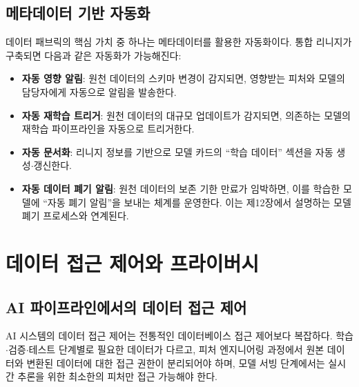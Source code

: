 \subsection{메타데이터 기반 자동화}
\label{sec:9.2.3}

데이터 패브릭의 핵심 가치 중 하나는 메타데이터를 활용한 자동화이다. 통합 리니지가 구축되면 다음과 같은 자동화가 가능해진다:

\begin{itemize}
 \item \textbf{자동 영향 알림}: 원천 데이터의 스키마 변경이 감지되면, 영향받는 피처와 모델의 담당자에게 자동으로 알림을 발송한다.
 \item \textbf{자동 재학습 트리거}: 원천 데이터의 대규모 업데이트가 감지되면, 의존하는 모델의 재학습 파이프라인을 자동으로 트리거한다.
 \item \textbf{자동 문서화}: 리니지 정보를 기반으로 모델 카드의 ``학습 데이터'' 섹션을 자동 생성$\cdot$갱신한다.
 \item \textbf{자동 데이터 폐기 알림}: 원천 데이터의 보존 기한 만료가 임박하면, 이를 학습한 모델에 ``자동 폐기 알림''을 보내는 체계를 운영한다. 이는 제12장에서 설명하는 모델 폐기 프로세스와 연계된다.
\end{itemize}


\section{데이터 접근 제어와 프라이버시}
\label{sec:9.3}

\subsection{AI 파이프라인에서의 데이터 접근 제어}
\label{sec:9.3.1}

AI 시스템의 데이터 접근 제어는 전통적인 데이터베이스 접근 제어보다 복잡하다. 학습$\cdot$검증$\cdot$테스트 단계별로 필요한 데이터가 다르고, 피처 엔지니어링 과정에서 원본 데이터와 변환된 데이터에 대한 접근 권한이 분리되어야 하며, 모델 서빙 단계에서는 실시간 추론을 위한 최소한의 피처만 접근 가능해야 한다.


